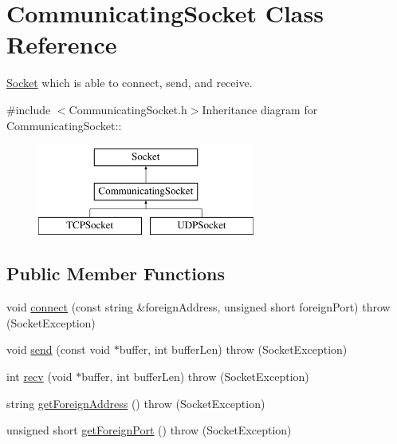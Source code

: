 \hypertarget{classCommunicatingSocket}{
\section{CommunicatingSocket Class Reference}
\label{classCommunicatingSocket}
}


\hyperlink{classSocket}{Socket} which is able to connect, send, and receive.  


{\ttfamily \#include $<$CommunicatingSocket.h$>$}Inheritance diagram for CommunicatingSocket::\begin{figure}[H]
\begin{center}
\leavevmode
\includegraphics[height=3cm]{classCommunicatingSocket}
\end{center}
\end{figure}
\subsection*{Public Member Functions}
\begin{DoxyCompactItemize}
\item 
void \hyperlink{classCommunicatingSocket_a9192374d9baab8e189860aa8d913683c}{connect} (const string \&foreignAddress, unsigned short foreignPort)  throw (SocketException)
\item 
void \hyperlink{classCommunicatingSocket_aca4e86085c064641e86ae24ea29bbb94}{send} (const void $\ast$buffer, int bufferLen)  throw (SocketException)
\item 
int \hyperlink{classCommunicatingSocket_a7cf1fd470c0060171b68df9f68c7bd01}{recv} (void $\ast$buffer, int bufferLen)  throw (SocketException)
\item 
string \hyperlink{classCommunicatingSocket_a13f9eca30ef56836cf23c163c848c09e}{getForeignAddress} ()  throw (SocketException)
\item 
unsigned short \hyperlink{classCommunicatingSocket_a184fbb4775184b87ebd886a5587eb1a3}{getForeignPort} ()  throw (SocketException)
\end{DoxyCompactItemize}

